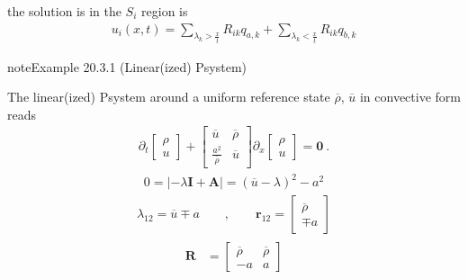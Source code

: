\documentclass[letterpaper,10pt,english]{jupyterBook}
\begin{document}
\sphinxAtStartPar
the solution is in the \(S_i\) region is
\begin{equation*}
\begin{split}u_i(x,t) = \sum_{\lambda_k > \frac{x}{t}} R_{ik} q_{a,k} +  \sum_{\lambda_k < \frac{x}{t}} R_{ik} q_{b,k}\end{split}
\end{equation*}\label{ch/pde/hyperbolic:example-0}
\begin{sphinxadmonition}{note}{Example 20.3.1 (Linear(ized) P\sphinxhyphen{}system)}



\sphinxAtStartPar
The linear(ized) P\sphinxhyphen{}system around a uniform reference state \(\overline{\rho}\), \(\overline{u}\) in convective form reads
\begin{equation*}
\begin{split}
  \partial_t \begin{bmatrix} \rho \\ u \end{bmatrix} + \begin{bmatrix} \overline{u} & \overline{\rho} \\ \frac{a^2}{\overline{\rho}} & \overline{u} \end{bmatrix} \partial_x \begin{bmatrix} \rho \\ u \end{bmatrix} = \mathbf{0} \ .
\end{split}
\end{equation*}
\sphinxAtStartPar
{}
\begin{equation*}
\begin{split}0 = \left| -\lambda \mathbf{I} + \mathbf{A} \right| = (\overline{u}-\lambda)^2 - a^2\end{split}
\end{equation*}\begin{equation*}
\begin{split}\lambda_{12} = \overline{u} \mp a \qquad , \qquad \mathbf{r}_{12} = \begin{bmatrix} \overline{\rho} \\ \mp a \end{bmatrix} \end{split}
\end{equation*}\begin{equation*}
\begin{split}\begin{aligned}
  \mathbf{R} & = \begin{bmatrix} \overline{\rho} & \overline{\rho} \\ - a & a \end{bmatrix} \\

\end{aligned}
\end{split}
\end{equation*}
\end{sphinxadmonition}
\end{document}
